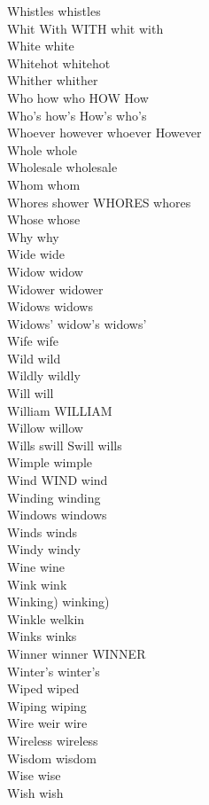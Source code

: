 Whistles whistles\\
Whit With WITH whit with\\
White white\\
Whitehot whitehot\\
Whither whither\\
Who how who HOW How\\
Who's how's How's who's\\
Whoever however whoever However\\
Whole whole\\
Wholesale wholesale\\
Whom whom\\
Whores shower WHORES whores\\
Whose whose\\
Why why\\
Wide wide\\
Widow widow\\
Widower widower\\
Widows widows\\
Widows' widow's widows'\\
Wife wife\\
Wild wild\\
Wildly wildly\\
Will will\\
William WILLIAM\\
Willow willow\\
Wills swill Swill wills\\
Wimple wimple\\
Wind WIND wind\\
Winding winding\\
Windows windows\\
Winds winds\\
Windy windy\\
Wine wine\\
Wink wink\\
Winking) winking)\\
Winkle welkin\\
Winks winks\\
Winner winner WINNER\\
Winter's winter's\\
Wiped wiped\\
Wiping wiping\\
Wire weir wire\\
Wireless wireless\\
Wisdom wisdom\\
Wise wise\\
Wish wish\\
